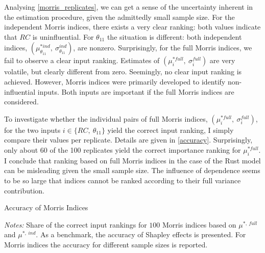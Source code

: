 Analysing \cref{morris_replicates}, we can get a sense of the uncertainty inherent in the estimation procedure,
given the admittedly small sample size. For the independent Morris indices, there exists a
very clear ranking: both values indicate that $RC$ is uninfluential. For $\theta_{11}$ the situation is
different: both independent indices, $(\mu^{\ast ind}_{\theta_{11}},\ \sigma_{\theta_{11}}^{ind})$, are nonzero. Surprisingly, for the full Morris indices,
we fail to observe a clear input ranking. Estimates of $(\mu^{\ast full}_i,\ \sigma_i^{full})$ are very volatile, but
clearly different from zero. Seemingly, no
clear input ranking is achieved. However, Morris indices were primarily developed to
identify non-influential inputs. Both inputs are important if the full Morris indices are
considered.

To investigate whether the individual pairs of full Morris indices, $(\mu^{\ast full}_i,\ \sigma_i^{full})$, for the
two inputs $i \in \{RC,\ \theta_{11}\}$ yield the correct input ranking, I simply compare their values
per replicate. Details are given in \cref{accuracy}. Surprisingly, only about 60 of the 100 replicates yield the correct importance ranking
for $\mu^{\ast full}_i$. I conclude that ranking based on full Morris indices in the case of the Rust model can be misleading given the small sample size.
The influence of dependence seems to be so large that indices cannot be ranked according to their full variance contribution.

\begin{table}
	\centering
	\caption{Accuracy of Morris Indices}
	\label{accuracy}
	\begin{threeparttable}
	\centering
	
	\begin{tablenotes}
	\small
	\item \textit{Notes:} Share of the correct input rankings for $100$ Morris indices based on $\mu^{\ast,\ full}$ and $\mu^{\ast,\ ind}$. As a benchmark, the accuracy of Shapley effects is presented. For Morris indices the accuracy for different sample sizes is reported.
	\end{tablenotes}
	\end{threeparttable}
\end{table}

